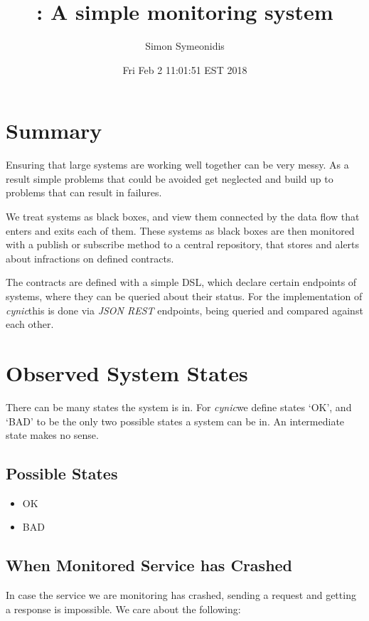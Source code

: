\documentclass[12pt,twoside]{article}
\title{\projectname: A simple monitoring system}
\author{Simon Symeonidis}
\date{Fri Feb  2 11:01:51 EST 2018}
\newcommand{\projectname}[0]{\textit{cynic}}
\begin{document}
\maketitle
\tableofcontents
\listoffigures
\lstlistoflistings



\section{Summary}
Ensuring that large systems are working well together can be
very messy. As a result simple problems that could be avoided
get neglected and build up to problems that can result in
failures.

We treat systems as black boxes, and view them connected by
the data flow that enters and exits each of them. These systems as
black boxes are then monitored with a publish or subscribe method to a
central repository, that stores and alerts about infractions on
defined contracts.

The contracts are defined with a simple DSL, which declare certain
endpoints of systems, where they can be queried about their
status. For the implementation of \projectname this is done via
\textit{JSON REST} endpoints, being queried and compared against each
other.

\section{Observed System States}
There can be many states the system is in. For \projectname we define
states `OK', and `BAD' to be the only two possible states a system can
be in. An intermediate state makes no sense.

\subsection{Possible States}
\begin{itemize}
\item OK
\item BAD
\end{itemize}

\subsection{When Monitored Service has Crashed}
In case the service we are monitoring has crashed, sending a request
and getting a response is impossible. We care about the following:
\end{document}
